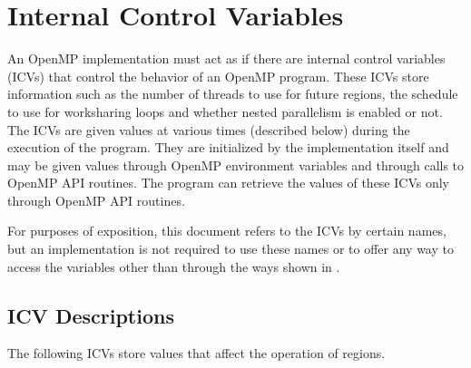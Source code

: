 \section{Internal Control Variables}
\label{sec:Internal Control Variables}
An OpenMP implementation must act as if there are internal control variables (ICVs) 
that control the behavior of an OpenMP program. These ICVs store information such as 
the number of threads to use for future  regions, the schedule to use for 
worksharing loops and whether nested parallelism is enabled or not. The ICVs are given 
values at various times (described below) during the execution of the program. They are 
initialized by the implementation itself and may be given values through OpenMP 
environment variables and through calls to OpenMP API routines. The program can 
retrieve the values of these ICVs only through OpenMP API routines.

For purposes of exposition, this document refers to the ICVs by certain names, but an 
implementation is not required to use these names or to offer any way to access the 
variables other than through the ways shown in 
.








\subsection{ICV Descriptions}
\label{subsec:ICV Descriptions}
The following ICVs store values that affect the operation of  regions.

